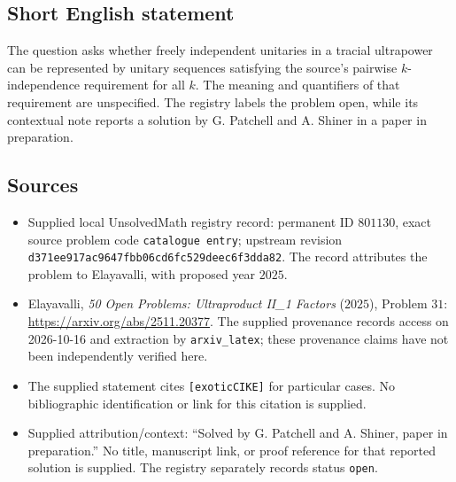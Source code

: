 \documentclass[11pt]{article}
\begin{document}
\subsection{Short English statement}
The question asks whether freely independent unitaries in a tracial ultrapower can be represented by unitary sequences satisfying the source's pairwise $k$-independence requirement for all $k$. The meaning and quantifiers of that requirement are unspecified. The registry labels the problem open, while its contextual note reports a solution by G. Patchell and A. Shiner in a paper in preparation.
\subsection{Sources}
\begin{itemize}
\item Supplied local UnsolvedMath registry record: permanent ID $801130$, exact source problem code \texttt{catalogue entry}; upstream revision \texttt{d371ee917ac9647fbb06cd6fc529deec6f3dda82}. The record attributes the problem to Elayavalli, with proposed year $2025$.
\item Elayavalli, \emph{50 Open Problems: Ultraproduct II\_1 Factors} ($2025$), Problem $31$: \url{https://arxiv.org/abs/2511.20377}. The supplied provenance records access on 2026-10-16 and extraction by \texttt{arxiv\_latex}; these provenance claims have not been independently verified here.
\item The supplied statement cites \texttt{[exoticCIKE]} for particular cases. No bibliographic identification or link for this citation is supplied.
\item Supplied attribution/context: ``Solved by G. Patchell and A. Shiner, paper in preparation.'' No title, manuscript link, or proof reference for that reported solution is supplied. The registry separately records status \texttt{open}.
\end{itemize}
\end{document}
